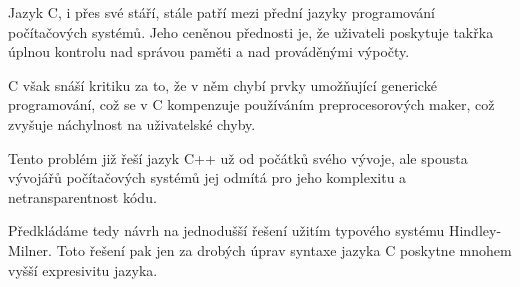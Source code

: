 \documentclass[12pt]{report}
\begin{document}
\ifEN
Jazyk C, i přes své stáří, stále patří mezi přední jazyky programování počítačových systémů. Jeho ceněnou přednosti je, že uživateli poskytuje takřka úplnou kontrolu nad správou paměti a nad prováděnými výpočty.

C však snáší kritiku za to, že v něm chybí prvky umožňující generické programování, což se v C kompenzuje používáním preprocesorových maker, což zvyšuje náchylnost na uživatelské chyby.

Tento problém již řeší jazyk C++ už od počátků svého vývoje, ale spousta vývojářů počítačových systémů jej odmítá pro jeho komplexitu a netransparentnost kódu.

Předkládáme tedy návrh na jednodušší řešení užitím typového systému Hindley-Milner. Toto řešení pak jen za drobých úprav syntaxe jazyka C poskytne mnohem vyšší expresivitu jazyka.
\else\Abstract\fi
\end{document}
